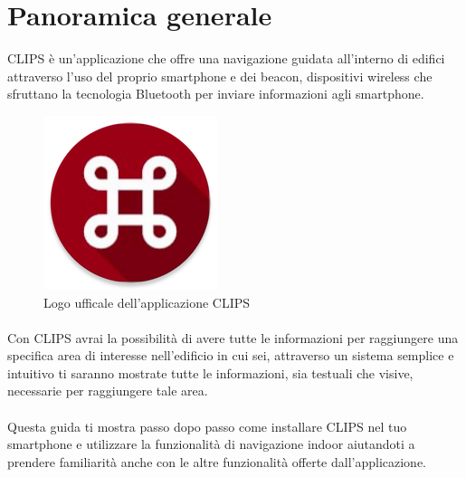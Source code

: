 \documentclass[../ClipsManualeUtente.tex]{subfiles}
\begin{document}
\section{Panoramica generale}

	CLIPS è un'applicazione che offre una navigazione guidata all'interno di edifici attraverso l'uso del proprio smartphone e dei beacon, dispositivi wireless che sfruttano la tecnologia Bluetooth per inviare informazioni agli smartphone.

	\begin{figure} [h]
		\centering
		\includegraphics[scale=0.5]{img/BigLogoApp}
		\caption{Logo ufficale dell'applicazione CLIPS}
		\label{fig:BigLogoApp}
	\end{figure}	
	
	\paragraph*{}
	Con CLIPS avrai la possibilità di avere tutte le informazioni per raggiungere una specifica area di interesse nell'edificio in cui sei, attraverso un sistema semplice e intuitivo ti saranno mostrate tutte le informazioni, sia testuali che visive, necessarie per raggiungere tale area.
	\paragraph*{}
	Questa guida ti mostra passo dopo passo come installare CLIPS nel tuo smartphone e utilizzare la funzionalità di navigazione indoor aiutandoti a prendere familiarità anche con le altre funzionalità offerte dall'applicazione.
	
\end{document}
